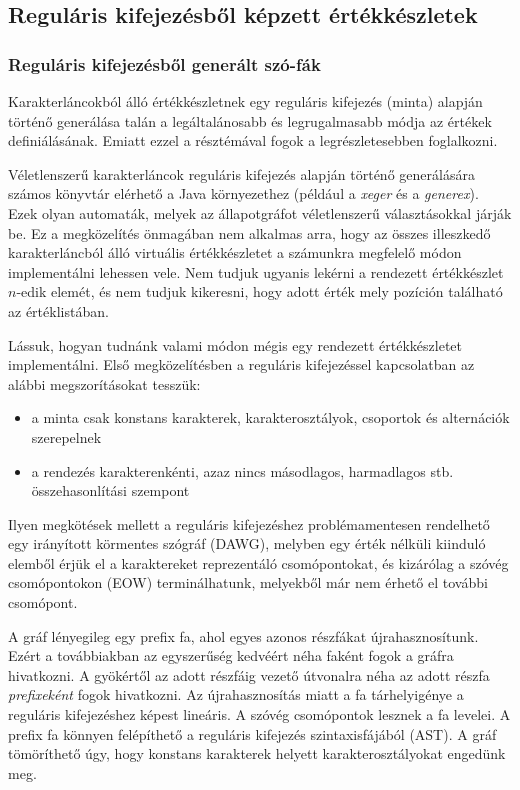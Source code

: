\documentclass[
    parspace,
    noindent,
    nohyp,
]{elteiktdk}[2023/04/10]
\begin{document}
\subsection{Reguláris kifejezésből képzett értékkészletek}

\subsubsection{Reguláris kifejezésből generált szó-fák}

Karakterláncokból álló értékkészletnek egy reguláris kifejezés (minta)
alapján történő generálása talán a legáltalánosabb és legrugalmasabb módja
az értékek definiálásának.
Emiatt ezzel a résztémával fogok a legrészletesebben foglalkozni.

Véletlenszerű karakterláncok reguláris kifejezés alapján történő generálására
számos könyvtár elérhető a Java környezethez
(például a \textit{xeger} és a \textit{generex}).
Ezek olyan automaták, melyek az állapotgráfot véletlenszerű választásokkal járják be.
Ez a megközelítés önmagában nem alkalmas arra,
hogy az összes illeszkedő karakterláncból álló virtuális értékkészletet
a számunkra megfelelő módon implementálni lehessen vele.
Nem tudjuk ugyanis lekérni a rendezett értékkészlet $n$-edik elemét,
és nem tudjuk kikeresni, hogy adott érték mely pozíción található az értéklistában.

Lássuk, hogyan tudnánk valami módon mégis egy rendezett értékkészletet implementálni.
Első megközelítésben a reguláris kifejezéssel kapcsolatban az alábbi megszorításokat tesszük:

\begin{itemize}
    \item a minta csak konstans karakterek, karakterosztályok, csoportok és alternációk szerepelnek
    \item a rendezés karakterenkénti, azaz nincs másodlagos, harmadlagos stb. összehasonlítási szempont
\end{itemize}

Ilyen megkötések mellett a reguláris kifejezéshez problémamentesen rendelhető egy
irányított körmentes szógráf (DAWG),
melyben egy érték nélküli kiinduló elemből érjük el a karaktereket reprezentáló csomópontokat,
és kizárólag a szóvég csomópontokon (EOW) terminálhatunk,
melyekből már nem érhető el további csomópont.\cite{AppelScrabble1988}

A gráf lényegileg egy prefix fa, ahol egyes azonos részfákat újrahasznosítunk.
Ezért a továbbiakban az egyszerűség kedvéért néha faként fogok a gráfra hivatkozni.
A gyökértől az adott részfáig vezető útvonalra
néha az adott részfa \textit{prefixeként} fogok hivatkozni.
Az újrahasznosítás miatt a fa tárhelyigénye a reguláris kifejezéshez képest lineáris.
A szóvég csomópontok lesznek a fa levelei.
A prefix fa könnyen felépíthető a reguláris kifejezés szintaxisfájából (AST).
A gráf tömöríthető úgy, hogy konstans karakterek helyett karakterosztályokat engedünk meg.
\end{document}
